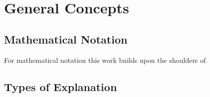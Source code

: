 \section{General Concepts}

\subsection{Mathematical Notation}
For mathematical notation this work builds upon the shoulders of~\cite{Kindermans.2018}

\subsection{Types of Explanation}




